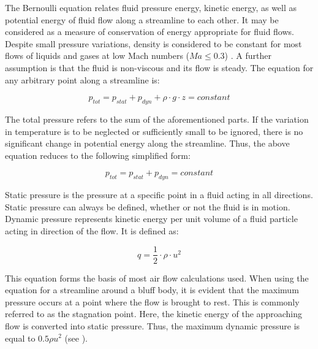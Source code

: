 The Bernoulli equation relates fluid pressure energy, kinetic energy, as well as potential energy of fluid flow along a streamline to each other. It may be considered as a measure of conservation of energy appropriate for fluid flows. Despite small pressure variations, density is considered to be constant for most flows of liquids and gases at low Mach numbers ($Ma \leq \num{0.3}$) \citep{fischer2008experimentelle, Hucho2011}. A further assumption is that the fluid is non-viscous and its flow is steady. The equation for any arbitrary point along a streamline is:

\begin{equation}
p_{tot} = p_{stat} + p_{dyn} + \rho \cdot g \cdot z = constant
\end{equation}

The total pressure refers to the sum of the aforementioned parts. If the variation in temperature is to be neglected or sufficiently small to be ignored, there is no significant change in potential energy along the streamline. Thus,  the above equation reduces to the following simplified form:

\begin{equation}
p_{tot} = p_{stat} + p_{dyn} = constant
\end{equation}

Static pressure is the pressure at a specific point in a fluid acting in all directions. Static pressure can always
be defined, whether or not the fluid is in motion.
Dynamic pressure represents kinetic energy per unit volume of a fluid particle acting in direction of the flow. It is defined as:

\begin{equation}
q = \frac{1}{2} \cdot \rho \cdot u^2
\end{equation}


This equation forms the basis of most air flow calculations used. When using the equation for a streamline around a bluff body, it is evident that the maximum pressure occurs at a point where the flow is brought to rest. This is commonly referred to as the stagnation point. Here, the kinetic energy of the approaching flow is converted into static pressure. Thus, the maximum dynamic pressure is equal to $0.5 \rho u^2$ (see ).



%
%




